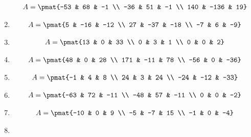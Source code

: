 \begin{enumerate}
\begin{align*}
A = \pmat{-53 & 68 & -1 \\ -36 & 51 & -1 \\ 140 & -136 & 19}
\end{align*}

\item

\begin{align*}
A = \pmat{5 & -16 & -12 \\ 27 & -37 & -18 \\ -7 & 6 & -9}
\end{align*}

\item

\begin{align*}
A = \pmat{13 & 0 & 33 \\ 0 & 3 & 1 \\ 0 & 0 & 2}
\end{align*}

\item

\begin{align*}
A = \pmat{48 & 0 & 28 \\ 171 & -11 & 78 \\ -56 & 0 & -36}
\end{align*}

\item

\begin{align*}
A = \pmat{-1 & 4 & 8 \\ 24 & 3 & 24 \\ -24 & -12 & -33}
\end{align*}

\item

\begin{align*}
A = \pmat{-63 & 72 & -11 \\ -48 & 57 & -11 \\ 0 & 0 & -2}
\end{align*}

\item

\begin{align*}
A = \pmat{-10 & 0 & 9 \\ -5 & -7 & 15 \\ -1 & 0 & -4}
\end{align*}

\item


\end{enumerate}
